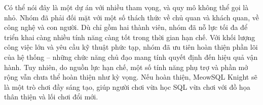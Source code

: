\hspace*{1cm} Có thể nói đây là một dự án với nhiều tham vọng, và quy mô không thể gọi là nhỏ. Nhóm đã phải đối mặt với một số thách thức về chủ quan và khách quan, về công nghệ và con người. Dù chỉ gồm hai thành viên, nhóm đã nỗ lực tối đa để triển khai càng nhiều tính năng càng tốt trong thời gian hạn chế. Với khối lượng công việc lớn và yêu cầu kỹ thuật phức tạp, nhóm đã ưu tiên hoàn thiện phần lõi của hệ thống – những chức năng chủ đạo mang tính quyết định đến hiệu quả vận hành. Tuy nhiên, do nguồn lực hạn chế, một số tính năng phụ trợ và phần mở rộng vẫn chưa thể hoàn thiện như kỳ vọng. Nếu hoàn thiện, MeowSQL Knight sẽ là một trò chơi đầy sáng tạo, giúp người chơi vừa học SQL vừa chơi với đồ họa thân thiện và lối chơi đổi mới.\\

\clearpage
{}

